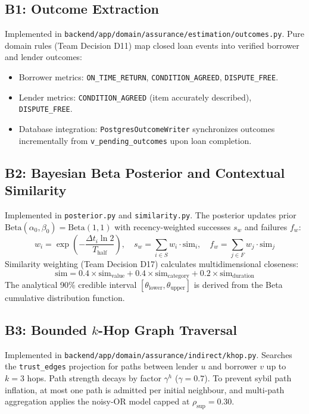 \subsection{B1: Outcome Extraction}
Implemented in \texttt{backend/app/domain/assurance/estimation/outcomes.py}. Pure domain rules (Team Decision D11) map closed loan events into verified borrower and lender outcomes:
\begin{itemize}
    \item Borrower metrics: \texttt{ON\_TIME\_RETURN}, \texttt{CONDITION\_AGREED}, \texttt{DISPUTE\_FREE}.
    \item Lender metrics: \texttt{CONDITION\_AGREED} (item accurately described), \texttt{DISPUTE\_FREE}.
    \item Database integration: \texttt{PostgresOutcomeWriter} synchronizes outcomes incrementally from \texttt{v\_pending\_outcomes} upon loan completion.
\end{itemize}

\subsection{B2: Bayesian Beta Posterior and Contextual Similarity}
Implemented in \texttt{posterior.py} and \texttt{similarity.py}. The posterior updates prior $\text{Beta}(\alpha_0, \beta_0) = \text{Beta}(1, 1)$ with recency-weighted successes $s_w$ and failures $f_w$:
\begin{equation}
    w_i = \exp\left(-\frac{\Delta t_i \ln 2}{T_{\text{half}}}\right), \quad s_w = \sum_{i \in S} w_i \cdot \text{sim}_i, \quad f_w = \sum_{j \in F} w_j \cdot \text{sim}_j
\end{equation}
Similarity weighting (Team Decision D17) calculates multidimensional closeness:
\begin{equation}
    \text{sim} = 0.4 \times \text{sim}_{\text{value}} + 0.4 \times \text{sim}_{\text{category}} + 0.2 \times \text{sim}_{\text{duration}}
\end{equation}
The analytical 90\% credible interval $[\theta_{\text{lower}}, \theta_{\text{upper}}]$ is derived from the Beta cumulative distribution function.

\subsection{B3: Bounded $k$-Hop Graph Traversal}
Implemented in \texttt{backend/app/domain/assurance/indirect/khop.py}. Searches the \texttt{trust\_edges} projection for paths between lender $u$ and borrower $v$ up to $k = 3$ hops. Path strength decays by factor $\gamma^h$ ($\gamma = 0.7$). To prevent sybil path inflation, at most one path is admitted per initial neighbour, and multi-path aggregation applies the noisy-OR model capped at $\rho_{\text{sup}} = 0.30$.

